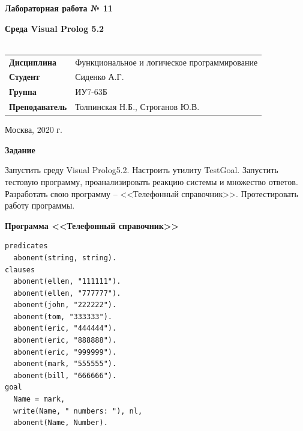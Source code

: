 \documentclass[a4paper,14pt]{extreport} %
\begin{document}
\begin{titlepage}
    \vspace{4cm}

    \begin{center}
        \textbf{Лабораторная работа № 11} \\ 
        \hfill
        
        \textbf{Среда Visual Prolog 5.2} \\
        \vspace{0.5cm}
        \textbf{} \\
    \end{center}

    \vspace{4cm}

    \begin{flushleft}
        \begin{tabular}{ll}
            \textbf{Дисциплина} & Функциональное и логическое программирование \\
            \textbf{Студент} & Сиденко А.Г. \\
            \textbf{Группа} & ИУ7-63Б \\
            \textbf{Преподаватель} & Толпинская Н.Б., Строганов Ю.В.  \\
        \end{tabular}
    \end{flushleft}

    \vspace{4cm}

   \begin{center}
        Москва, 2020 г.
    \end{center}

\end{titlepage}

\textbf{Задание}

Запустить среду Visual Prolog5.2. Настроить утилиту TestGoal. Запустить тестовую программу, проанализировать реакцию системы и множество ответов. Разработать свою программу -- <<Телефонный справочник>>. Протестировать работу программы. 

\textbf{Программа <<Телефонный справочник>>}

\begin{lstlisting}
predicates
  abonent(string, string).
clauses
  abonent(ellen, "111111").
  abonent(ellen, "777777").
  abonent(john, "222222").
  abonent(tom, "333333").
  abonent(eric, "444444").
  abonent(eric, "888888").
  abonent(eric, "999999").
  abonent(mark, "555555").
  abonent(bill, "666666").
goal
  Name = mark,
  write(Name, " numbers: "), nl,
  abonent(Name, Number).
\end{lstlisting}
\end{document}
